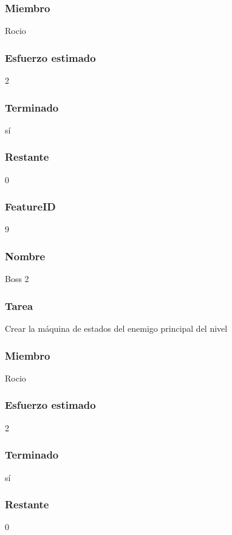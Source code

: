 \subsubsection{Miembro} Rocio
\subsubsection{Esfuerzo estimado} 2
\subsubsection{Terminado} sí
\subsubsection{Restante} 0

\subsubsection{FeatureID} 9
\subsubsection{Nombre} Boss 2
\subsubsection{Tarea} Crear la máquina de estados del enemigo principal del nivel
\subsubsection{Miembro} Rocio
\subsubsection{Esfuerzo estimado} 2
\subsubsection{Terminado} sí
\subsubsection{Restante} 0
